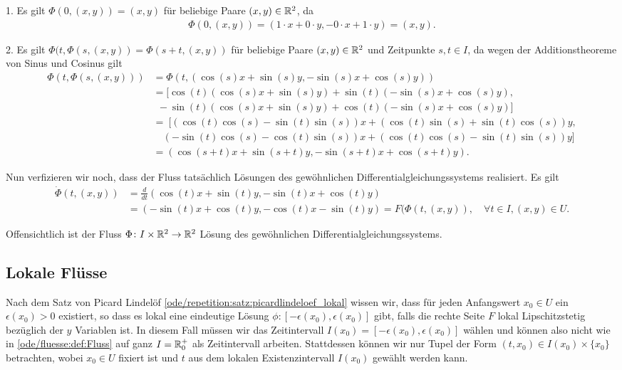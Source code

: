 \begin{example}{}{}
\par
1. Es gilt \(\Phi(0, (x,y)) = (x,y)\) für beliebige Paare \((x,y) \in \mathbb{R}^2\), da
\begin{align*}
\Phi(0, (x,y)) = (1\cdot x + 0\cdot y, - 0 \cdot x + 1 \cdot y) = (x,y).
\end{align*}
\par
2. Es gilt \(\Phi(t, \Phi(s,(x,y)) = \Phi(s + t, (x,y))\) für beliebige Paare \((x,y) \in \mathbb{R}^2\) und Zeitpunkte \(s,t \in I\), da wegen der Additionstheoreme von Sinus und Cosinus gilt
\begin{align*}
\Phi(t, \Phi(s,(x,y))) &= \Phi(t, (\cos(s)x + \sin(s)y, -\sin(s)x + \cos(s)y)) \\
&= [\cos(t)(\cos(s)x + \sin(s)y) + \sin(t)(-\sin(s)x + \cos(s)y), \\
& \ \ -\sin(t)(\cos(s)x + \sin(s)y) + \cos(t)(-\sin(s)x + \cos(s)y)]\\
&= \ [ (\cos(t)\cos(s) - \sin(t)\sin(s))x + (\cos(t)\sin(s) + \sin(t)\cos(s))y, \\
& \quad (-\sin(t)\cos(s) - \cos(t)\sin(s))x + (\cos(t)\cos(s) - \sin(t)\sin(s))y ] \\
&= (\cos(s+t)x + \sin(s+t)y, -\sin(s+t)x + \cos(s+t)y).
\end{align*}
\par
Nun verfizieren wir noch, dass der Fluss tatsächlich Lösungen des gewöhnlichen Differentialgleichungssystems realisiert.
Es gilt
\begin{align*}
\dot{\Phi}(t, (x,y)) &= \frac{d}{dt}(\cos(t)x + \sin(t)y, -\sin(t)x + \cos(t)y) \\
&= (-\sin(t)x + \cos(t)y, -\cos(t)x - \sin(t)y) = F(\Phi(t,(x,y)), \quad \forall t \in I, (x,y) \in U.
\end{align*}
\par
Offensichtlich ist der Fluss \(\Phi \colon I \times \mathbb{R}^2 \rightarrow \mathbb{R}^2\) Lösung des gewöhnlichen Differentialgleichungssystems.
\end{example}


\subsection{Lokale Flüsse}
\label{\detokenize{ode/fluesse:lokale-flusse}}
\par
Nach dem Satz von Picard Lindelöf \cref{ode/repetition:satz:picardlindeloef_lokal} wissen wir, dass für jeden Anfangswert \(x_0\in U\) ein \(\epsilon(x_0)>0\) existiert, so dass es lokal eine eindeutige Lösung \(\phi: [-\epsilon(x_0), \epsilon(x_0)]\) gibt, falls die rechte Seite \(F\) lokal Lipschitzstetig bezüglich der \(y\) Variablen ist.
In diesem Fall müssen wir das Zeitintervall \(I(x_0)=[-\epsilon(x_0), \epsilon(x_0)]\) wählen und können also nicht wie in \cref{ode/fluesse:def:Fluss} auf ganz \(I = \mathbb{R}^+_0\) als Zeitintervall arbeiten.
Stattdessen können wir nur Tupel der Form \((t, x_0) \in I(x_0) \times \{x_0\}\) betrachten, wobei \(x_0\in U\) fixiert ist und \(t\) aus dem lokalen Existenzintervall \(I(x_0)\) gewählt werden kann.

